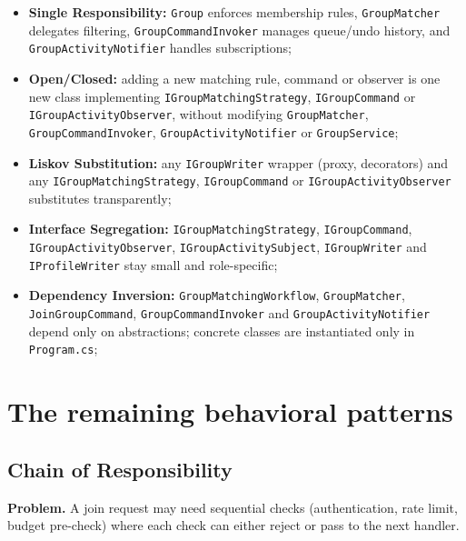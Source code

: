 \documentclass{utmreport}
\providecommand{\tightlist}{\setlength{\itemsep}{0pt}\setlength{\parskip}{0pt}}
\providecommand{\passthrough}[1]{#1}
\begin{document}
\begin{itemize}
\tightlist
\item \textbf{Single Responsibility:} \passthrough{\lstinline!Group!} enforces membership rules, \passthrough{\lstinline!GroupMatcher!} delegates filtering, \passthrough{\lstinline!GroupCommandInvoker!} manages queue/undo history, and \passthrough{\lstinline!GroupActivityNotifier!} handles subscriptions;
\item \textbf{Open/Closed:} adding a new matching rule, command or observer is one new class implementing \passthrough{\lstinline!IGroupMatchingStrategy!}, \passthrough{\lstinline!IGroupCommand!} or \passthrough{\lstinline!IGroupActivityObserver!}, without modifying \passthrough{\lstinline!GroupMatcher!}, \passthrough{\lstinline!GroupCommandInvoker!}, \passthrough{\lstinline!GroupActivityNotifier!} or \passthrough{\lstinline!GroupService!};
\item \textbf{Liskov Substitution:} any \passthrough{\lstinline!IGroupWriter!} wrapper (proxy, decorators) and any \passthrough{\lstinline!IGroupMatchingStrategy!}, \passthrough{\lstinline!IGroupCommand!} or \passthrough{\lstinline!IGroupActivityObserver!} substitutes transparently;
\item \textbf{Interface Segregation:} \passthrough{\lstinline!IGroupMatchingStrategy!}, \passthrough{\lstinline!IGroupCommand!}, \passthrough{\lstinline!IGroupActivityObserver!}, \passthrough{\lstinline!IGroupActivitySubject!}, \passthrough{\lstinline!IGroupWriter!} and \passthrough{\lstinline!IProfileWriter!} stay small and role-specific;
\item \textbf{Dependency Inversion:} \passthrough{\lstinline!GroupMatchingWorkflow!}, \passthrough{\lstinline!GroupMatcher!}, \passthrough{\lstinline!JoinGroupCommand!}, \passthrough{\lstinline!GroupCommandInvoker!} and \passthrough{\lstinline!GroupActivityNotifier!} depend only on abstractions; concrete classes are instantiated only in \passthrough{\lstinline!Program.cs!};
\end{itemize}

\chapter{The remaining behavioral patterns}

\section{Chain of Responsibility}

\textbf{Problem.} A join request may need sequential checks (authentication, rate limit, budget pre-check) where each check can either reject or pass to the next handler.
\end{document}
